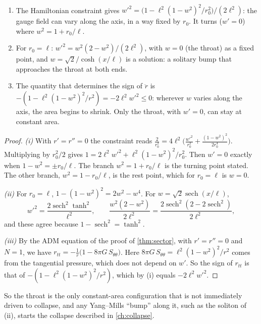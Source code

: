 \begin{theorem}\label{thm:constarea}\ver\
\begin{enumerate}[label=(\roman*)]
\item The Hamiltonian constraint gives $w'^2=\bigl(1-\ell^2(1-w^2)^2/r_0^2\bigr)/(2\ell^2)$: the gauge field can vary along the axis, in a way fixed by $r_0$. It turns ($w'=0$) where $w^2=1+r_0/\ell$.
\item For $r_0=\ell$: $w'^2=w^2(2-w^2)/(2\ell^2)$, with $w=0$ (the throat) as a fixed point, and $w=\sqrt2/\cosh(x/\ell)$ is a solution: a solitary bump that approaches the throat at both ends.
\item The quantity that determines the sign of $\ddot r$ is $-(1-\ell^2(1-w^2)^2/r^2)=-2\ell^2w'^2\le0$: wherever $w$ varies along the axis, the area begins to shrink. Only the throat, with $w'=0$, can stay at constant area.
\end{enumerate}
\end{theorem}
\begin{proof}
\emph{(i)} With $r'=r''=0$ the constraint reads $\frac2{r_0^2}=4\ell^2\bigl(\frac{w'^2}{r_0^2}+\frac{(1-w^2)^2}{2r_0^4}\bigr)$. Multiplying by $r_0^2/2$ gives $1=2\ell^2w'^2+\ell^2(1-w^2)^2/r_0^2$. Then $w'=0$ exactly when $1-w^2=\pm r_0/\ell$. The branch $w^2=1+r_0/\ell$ is the turning point stated. The other branch, $w^2=1-r_0/\ell$, is the rest point, which for $r_0=\ell$ is $w=0$.

\emph{(ii)} For $r_0=\ell$, $1-(1-w^2)^2=2w^2-w^4$. For $w=\sqrt2\operatorname{sech}(x/\ell)$,
\[
w'^2=\frac{2\operatorname{sech}^2\tanh^2}{\ell^2},\qquad\frac{w^2(2-w^2)}{2\ell^2}=\frac{2\operatorname{sech}^2(2-2\operatorname{sech}^2)}{2\ell^2},
\]
and these agree because $1-\operatorname{sech}^2=\tanh^2$.

\emph{(iii)} By the ADM equation of the proof of \cref{thm:sector}, with $r'=r''=0$ and $N=1$, we have $r_{tt}=-\frac1r\bigl(1-8\pi G\,S_{\theta\theta}\bigr)$. Here $8\pi G\,S_{\theta\theta}=\ell^2(1-w^2)^2/r^2$ comes from the tangential pressure, which does not depend on $w'$. So the sign of $r_{tt}$ is that of $-(1-\ell^2(1-w^2)^2/r^2)$, which by (i) equals $-2\ell^2w'^2$.
\end{proof}


So the throat is the only constant-area configuration that is not immediately driven to collapse, and any Yang--Mills ``bump'' along it, such as the soliton of (ii), starts the collapse described in \cref{ch:collapse}.

